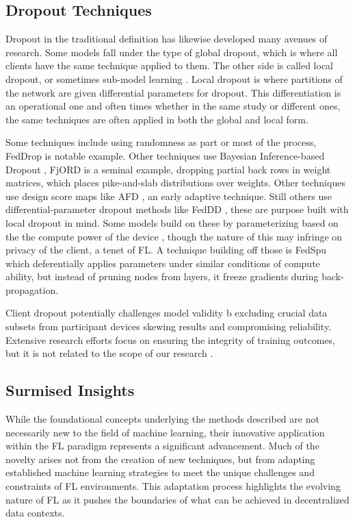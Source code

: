 \documentclass{article}
\begin{document}
\subsection{Dropout Techniques}
Dropout in the traditional definition has likewise developed many avenues of research. Some models fall under the type of global dropout, which is where all clients have the same technique applied to them. The other side is called local dropout, or sometimes sub-model learning \cite{jia2022x}. Local dropout is where partitions of the network are given differential parameters for dropout. This differentiation is an operational one and often times whether in the same study or different ones, the same techniques are often applied in both the global and local form.

Some techniques include using randomness as part or most of the process\cite{wen2022federated}, FedDrop is notable example. Other techniques use Bayesian Inference-based Dropout \cite{gal2016theoretically, xue2023fedbiad}, FjORD \cite{horvath2021fjord} is a seminal example, dropping partial back rows in weight matrices, which places pike-and-slab distributions over weights. Other techniques use design score maps like AFD \cite{nader2020adaptive}, an early adaptive technique. Still others use differential-parameter dropout methods like FedDD \cite{feng2023feddd,nader2020adaptive}, these are purpose built with local dropout in mind. Some models build on these by parameterizing based on the the compute power of the device \cite{wen2022federated, wang2024fluid}, though the nature of this may infringe on privacy of the client, a tenet of FL. A technique building off those is FedSpu \cite{niu2024fedspu} which deferentially applies parameters under similar conditions of compute ability, but instead of pruning nodes from layers, it freeze gradients during back-propagation.

Client dropout potentially challenges model validity b excluding crucial data subsets from participant devices skewing results and compromising reliability. Extensive research efforts focus on ensuring the integrity of training outcomes, but it is not related to the scope of our research \cite{mao2022communication, lim2021decentralized, shao2022dres}.

\subsection{Surmised Insights}
While the foundational concepts underlying the methods described are not necessarily new to the field of machine learning, their innovative application within the FL paradigm represents a significant advancement. Much of the novelty arises not from the creation of new techniques, but from adapting established machine learning strategies to meet the unique challenges and constraints of FL environments. This adaptation process highlights the evolving nature of FL as it pushes the boundaries of what can be achieved in decentralized data contexts.
\end{document}
